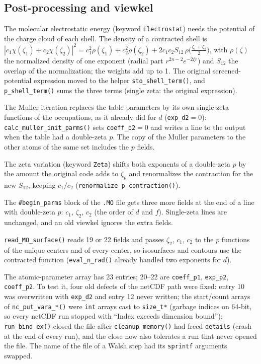 \documentclass[11pt,a4paper]{article}
\newcommand{\file}[1]{\texttt{#1}}
\newcommand{\fn}[1]{\texttt{#1()}}
\newcommand{\var}[1]{\texttt{#1}}
\begin{document}
\subsection{Post-processing and viewkel}\label{sec:pdzpost}
\begin{description}[style=nextline,leftmargin=1.2em]
\item[\file{electrostat.c}] The molecular electrostatic energy (keyword
  \texttt{Electrostat}) needs the potential of the charge cloud of each shell. The density of
  a contracted shell is
  $|c_1\chi(\zeta_1)+c_2\chi(\zeta_2)|^2 = c_1^2\rho(\zeta_1)+c_2^2\rho(\zeta_2)
  +2c_1c_2S_{12}\,\rho\big(\tfrac{\zeta_1+\zeta_2}{2}\big)$, with $\rho(\zeta)$ the normalized
  density of one exponent (radial part $r^{2n-2}e^{-2\zeta r}$) and $S_{12}$ the overlap of
  the normalization; the weights add up to 1. The original screened-potential expression
  moved to the helper \fn{sto\_shell\_term}, and \fn{p\_shell\_term} sums the three terms
  (single zeta: the original expression).
\item[\file{muller.c}, \file{fileio.c}] The Muller iteration replaces the table parameters
  by its own single-zeta functions of the occupations, as it already did for $d$
  (\var{exp\_d2}$=0$): \fn{calc\_muller\_init\_parms} sets \var{coeff\_p2}$=0$ and writes a
  line to the output when the table had a double-zeta $p$. The copy of the Muller parameters
  to the other atoms of the same set includes the $p$ fields.
\item[\file{zetas.c}] The zeta variation (keyword \texttt{Zeta}) shifts both exponents of a
  double-zeta $p$ by the amount the original code adds to $\zeta_p$ and renormalizes the
  contraction for the new $S_{12}$, keeping $c_1/c_2$ (\fn{renormalize\_p\_contraction}).
\item[\file{genutil.c}] The \texttt{\#begin\_parms} block of the \texttt{.MO} file gets three
  more fields at the end of a line with double-zeta $p$: $c_1$, $\zeta_2$, $c_2$ (the order
  of $d$ and $f$). Single-zeta lines are unchanged, and an old viewkel ignores the extra
  fields.
\item[\file{viewkel/fit\_orbs.c}] \fn{read\_MO\_surface} reads 19 or 22 fields and passes
  $\zeta_2$, $c_1$, $c_2$ to the $p$ functions of the unique centers and of every center,
  so isosurfaces and contours use the contracted function (\fn{eval\_n\_rad} already handled
  two exponents for $d$).
\item[\file{netCDF\_support.c}] The atomic-parameter array has 23 entries; 20--22 are
  \var{coeff\_p1}, \var{exp\_p2}, \var{coeff\_p2}. To test it, four old defects of the
  netCDF path were fixed: entry 10 was overwritten with \var{exp\_d2} and entry 12 never
  written; the start/count arrays of \fn{nc\_put\_vara\_*} were \texttt{int} arrays cast to
  \texttt{size\_t*} (garbage indices on 64-bit, so every netCDF run stopped with ``Index
  exceeds dimension bound''); \fn{run\_bind\_ex} closed the file after
  \fn{cleanup\_memory} had freed \var{details} (crash at the end of every run), and the
  close now also tolerates a run that never opened the file. The name of the file of a
  Walsh step had its \texttt{sprintf} arguments swapped.
\end{description}
\end{document}
